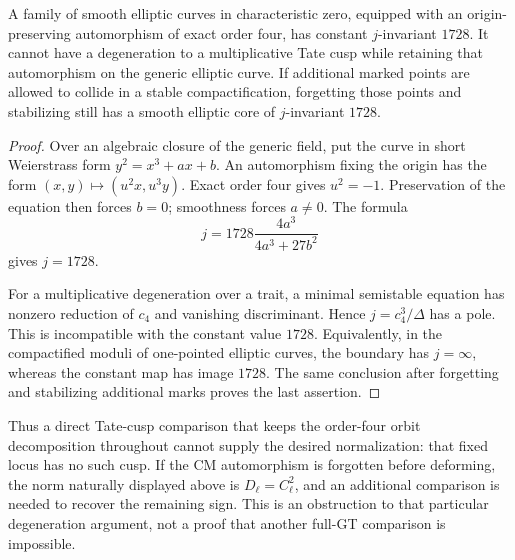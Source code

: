 \begin{proposition}\label{prop:no-cm-preserving-tate-degeneration}
A family of smooth elliptic curves in characteristic zero,
equipped with an origin-preserving automorphism of exact
order four, has constant \(j\)-invariant \(1728\).
It cannot have a degeneration to a multiplicative Tate
cusp while retaining that automorphism on the generic
elliptic curve.  If additional marked points are allowed
to collide in a stable compactification, forgetting
those points and stabilizing still has a smooth
elliptic core of \(j\)-invariant \(1728\).
\end{proposition}
\begin{proof}
Over an algebraic closure of the generic field, put the
curve in short Weierstrass form
\(y^2=x^3+ax+b\).  An automorphism fixing the origin
has the form \((x,y)\mapsto(u^2x,u^3y)\).
Exact order four gives \(u^2=-1\).  Preservation of
the equation then forces \(b=0\); smoothness forces
\(a\ne0\).  The formula
\[
                  j=1728\frac{4a^3}{4a^3+27b^2}
\]
gives \(j=1728\).

For a multiplicative degeneration over a trait, a minimal
semistable equation has nonzero reduction of \(c_4\)
and vanishing discriminant.  Hence
\(j=c_4^3/\Delta\) has a pole.  This is incompatible
with the constant value \(1728\).  Equivalently, in
the compactified moduli of one-pointed elliptic curves,
the boundary has \(j=\infty\), whereas the constant
map has image \(1728\).  The same conclusion after
forgetting and stabilizing additional marks proves the
last assertion.
\end{proof}

Thus a direct Tate-cusp comparison that keeps the
order-four orbit decomposition throughout cannot supply
the desired normalization: that fixed locus has no such
cusp.  If the CM automorphism is forgotten before
deforming, the norm naturally displayed above is
\(D_\ell=C_\ell^2\), and an additional comparison is
needed to recover the remaining sign.  This is an
obstruction to that particular degeneration argument,
not a proof that another full-GT comparison is impossible.
